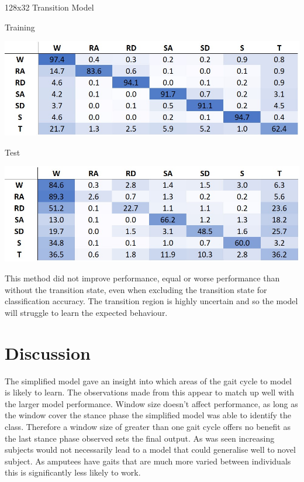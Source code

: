 \documentclass[sensors,article,submit,moreauthors,pdftex]{Definitions/mdpi}
\begin{document}
\begin{table}[!hbt]
    \centering
    \caption{128x32 Transition Model}
    \label{tab:128x32_transition_confusion_matrix}
    \begin{subtable}{.45\textwidth}
        \centering
        \caption{Training}
        \label{tab:tran_model_conf_matrix_training_128x32}
        \includegraphics[width=\textwidth]{Figures/results/conf_matricies/Training_128x32_T.jpg}
    \end{subtable}
    \hfil
    \begin{subtable}{.45\textwidth}
        \centering
        \caption{Test}
        \label{tab:tran_model_conf_matrix_test_128x32}
        \includegraphics[width=\textwidth]{Figures/results/conf_matricies/Test_128x32_T.jpg}
    \end{subtable}
\end{table}

This method did not improve performance, equal or worse performance than without the transition state, even when excluding the transition state for classification accuracy. The transition region is highly uncertain and so the model will struggle to learn the expected behaviour.

\section{Discussion}
\label{sec:discussion}
The simplified model gave an insight into which areas of the gait cycle to model is likely to learn. The observations made from this appear to match up well with the larger model performance. Window size doesn't affect performance, as long as the window cover the stance phase the simplified model was able to identify the class. Therefore a window size of greater than one gait cycle offers no benefit as the last stance phase observed sets the final output. As was seen increasing subjects would not necessarily lead to a model that could generalise well to novel subject. As amputees have gaits that are much more varied between individuals this is significantly less likely to work.
\end{document}
